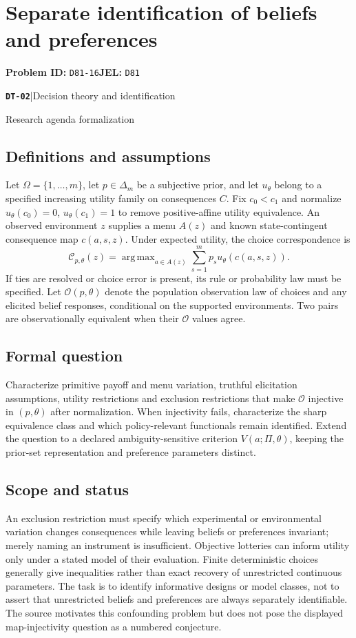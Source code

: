 \documentclass[11pt,a4paper]{article}
\DeclareMathOperator*{\argmax}{arg\,max}
\newcommand{\entrymeta}[3]{{\sffamily\small\color{muted}\textbf{\texttt{#1}}\quad|\quad #2\par #3\par}}
\begin{document}
\section*{Separate identification of beliefs and preferences}
\textbf{Problem ID:} \texttt{D81-16}\quad \textbf{JEL:} \texttt{D81}\par
\label{problem:OP-0587}
\label{beyond:DT-02}
\entrymeta{DT-02}{Decision theory and identification}{Research agenda formalization}
\subsection*{Definitions and assumptions}
Let $\Omega=\{1,\ldots,m\}$, let $p\in\Delta_m$ be a subjective prior, and let $u_\theta$ belong to a specified increasing utility family on consequences $C$. Fix $c_0<c_1$ and normalize $u_\theta(c_0)=0$, $u_\theta(c_1)=1$ to remove positive-affine utility equivalence. An observed environment $z$ supplies a menu $A(z)$ and known state-contingent consequence map $c(a,s,z)$. Under expected utility, the choice correspondence is
\[
 \mathcal C_{p,\theta}(z)=\argmax_{a\in A(z)}
 \sum_{s=1}^{m}p_su_\theta(c(a,s,z)).
\]
If ties are resolved or choice error is present, its rule or probability law must be specified. Let $\mathcal O(p,\theta)$ denote the population observation law of choices and any elicited belief responses, conditional on the supported environments. Two pairs are observationally equivalent when their $\mathcal O$ values agree.
\subsection*{Formal question}
Characterize primitive payoff and menu variation, truthful elicitation assumptions, utility restrictions and exclusion restrictions that make $\mathcal O$ injective in $(p,\theta)$ after normalization. When injectivity fails, characterize the sharp equivalence class and which policy-relevant functionals remain identified. Extend the question to a declared ambiguity-sensitive criterion $V(a;\Pi,\theta)$, keeping the prior-set representation and preference parameters distinct.
\subsection*{Scope and status}
An exclusion restriction must specify which experimental or environmental variation changes consequences while leaving beliefs or preferences invariant; merely naming an instrument is insufficient. Objective lotteries can inform utility only under a stated model of their evaluation. Finite deterministic choices generally give inequalities rather than exact recovery of unrestricted continuous parameters. The task is to identify informative designs or model classes, not to assert that unrestricted beliefs and preferences are always separately identifiable. The source motivates this confounding problem but does not pose the displayed map-injectivity question as a numbered conjecture.
\end{document}
